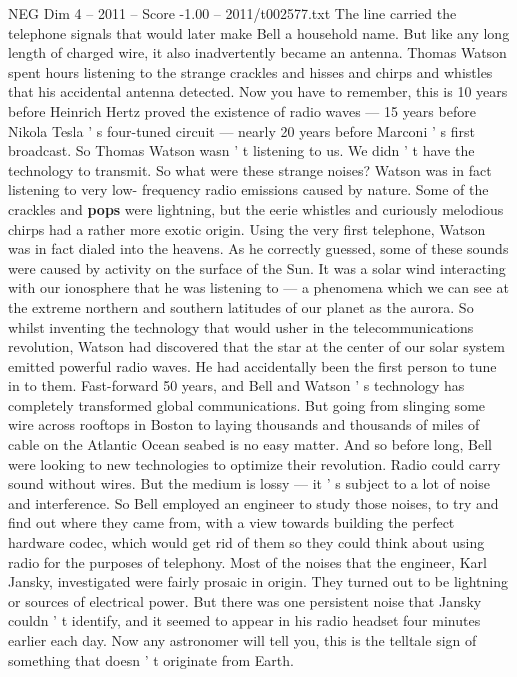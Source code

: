 \begin{textsample}{NEG Dim 4 – 2011 – Score -1.00 – 2011/t002577.txt}
The line carried the telephone signals that would later make Bell a household name.
But like any long length of charged wire, it also inadvertently became an antenna.
Thomas Watson spent hours listening to the strange crackles and hisses and chirps and whistles that his accidental antenna detected.
Now you have to remember, this is 10 years before Heinrich Hertz proved the existence of radio waves — 15 years before Nikola Tesla ' s four-tuned circuit — nearly 20 years before Marconi ' s first broadcast.
So Thomas Watson wasn ' t listening to us.
We didn ' t have the technology to transmit.
So what were these strange noises?
Watson was in fact listening to very low- frequency radio emissions caused by nature.
Some of the crackles and \textbf{pops} were lightning, but the eerie whistles and curiously melodious chirps had a rather more exotic origin.
Using the very first telephone, Watson was in fact dialed into the heavens.
As he correctly guessed, some of these sounds were caused by activity on the surface of the Sun.
It was a solar wind interacting with our ionosphere that he was listening to — a phenomena which we can see at the extreme northern and southern latitudes of our planet as the aurora.
So whilst inventing the technology that would usher in the telecommunications revolution, Watson had discovered that the star at the center of our solar system emitted powerful radio waves.
He had accidentally been the first person to tune in to them.
Fast-forward 50 years, and Bell and Watson ' s technology has completely transformed global communications.
But going from slinging some wire across rooftops in Boston to laying thousands and thousands of miles of cable on the Atlantic Ocean seabed is no easy matter.
And so before long, Bell were looking to new technologies to optimize their revolution.
Radio could carry sound without wires.
But the medium is lossy — it ' s subject to a lot of noise and interference.
So Bell employed an engineer to study those noises, to try and find out where they came from, with a view towards building the perfect hardware codec, which would get rid of them so they could think about using radio for the purposes of telephony.
Most of the noises that the engineer, Karl Jansky, investigated were fairly prosaic in origin.
They turned out to be lightning or sources of electrical power.
But there was one persistent noise that Jansky couldn ' t identify, and it seemed to appear in his radio headset four minutes earlier each day.
Now any astronomer will tell you, this is the telltale sign of something that doesn ' t originate from Earth.

\end{textsample}
